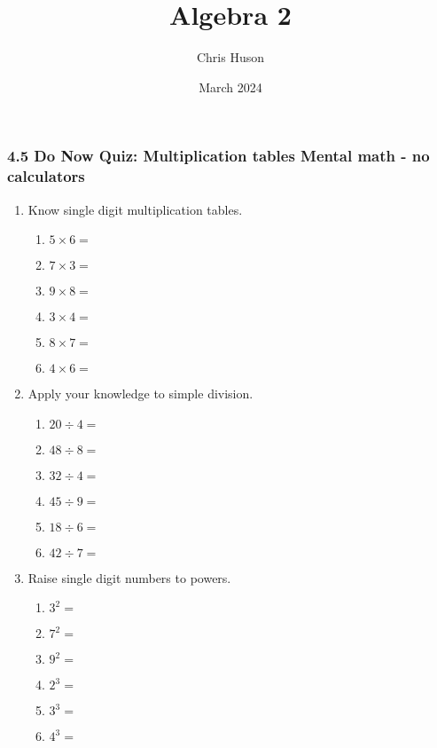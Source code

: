 \documentclass[12pt, twoside]{article}
\title{Algebra 2}
\author{Chris Huson}
\date{March 2024}
\begin{document}
\subsubsection*{4.5 Do Now Quiz: Multiplication tables \hfill Mental math - no calculators}
\begin{enumerate}[itemsep=0.5cm]

\item Know single digit multiplication tables. 
    \begin{multicols}{2}
    \begin{enumerate}[itemsep=0.5cm]
        \item $5 \times 6 =$
        \item $7 \times 3 =$
        \item $9 \times 8 =$
        \item $3 \times 4 =$
        \item $8 \times 7 =$
        \item $4 \times 6 =$
    \end{enumerate}
    \end{multicols}

\item Apply your knowledge to simple division.
    \begin{multicols}{2}
    \begin{enumerate}[itemsep=0.5cm]
        \item $20 \div 4 =$
        \item $48 \div 8 =$
        \item $32 \div 4 =$
        \item $45 \div 9 =$
        \item $18 \div 6 =$
        \item $42 \div 7 =$
    \end{enumerate}
    \end{multicols}

\item Raise single digit numbers to powers.
    \begin{multicols}{2}
    \begin{enumerate}[itemsep=0.5cm]
        \item $3^2=$
        \item $7^2=$
        \item $9^2=$
        \item $2^3=$
        \item $3^3=$
        \item $4^3=$
    \end{enumerate}
    \end{multicols}


\end{enumerate}
\end{document}
